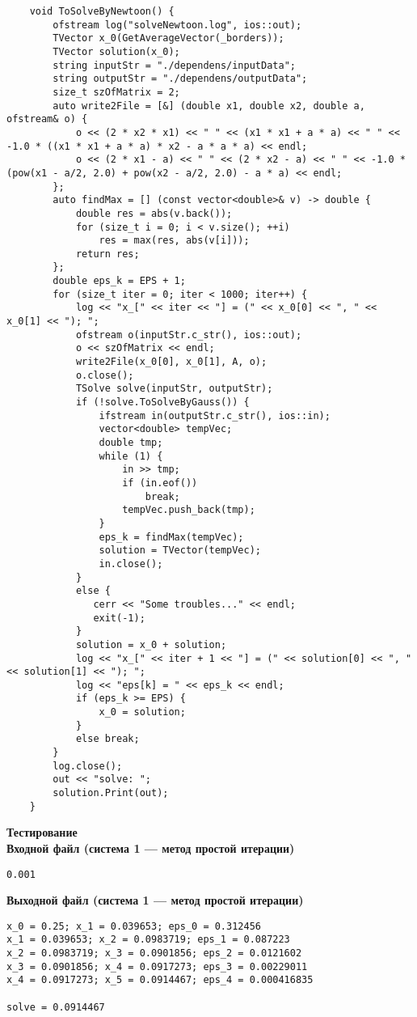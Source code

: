 \begin{lstlisting}
    void ToSolveByNewtoon() {
        ofstream log("solveNewtoon.log", ios::out);
        TVector x_0(GetAverageVector(_borders)); 
		TVector solution(x_0);
		string inputStr = "./dependens/inputData";
		string outputStr = "./dependens/outputData";
		size_t szOfMatrix = 2;
		auto write2File = [&] (double x1, double x2, double a, ofstream& o) {
			o << (2 * x2 * x1) << " " << (x1 * x1 + a * a) << " " << -1.0 * ((x1 * x1 + a * a) * x2 - a * a * a) << endl;
			o << (2 * x1 - a) << " " << (2 * x2 - a) << " " << -1.0 * (pow(x1 - a/2, 2.0) + pow(x2 - a/2, 2.0) - a * a) << endl;
		};
		auto findMax = [] (const vector<double>& v) -> double {
			double res = abs(v.back());
			for (size_t i = 0; i < v.size(); ++i)
				res = max(res, abs(v[i]));
			return res;
		};
		double eps_k = EPS + 1;
	    for (size_t iter = 0; iter < 1000; iter++) {
		    log << "x_[" << iter << "] = (" << x_0[0] << ", " << x_0[1] << "); ";
			ofstream o(inputStr.c_str(), ios::out);
		    o << szOfMatrix << endl;
			write2File(x_0[0], x_0[1], A, o);
		    o.close();
			TSolve solve(inputStr, outputStr);
			if (!solve.ToSolveByGauss()) {
				ifstream in(outputStr.c_str(), ios::in);
	            vector<double> tempVec;
				double tmp;
				while (1) {
				    in >> tmp;
				    if (in.eof())
				        break;
	                tempVec.push_back(tmp);
				}
				eps_k = findMax(tempVec);
				solution = TVector(tempVec);
				in.close();
		    }
	 	    else {
	           cerr << "Some troubles..." << endl;
		       exit(-1);
	 	    }
		    solution = x_0 + solution;
		    log << "x_[" << iter + 1 << "] = (" << solution[0] << ", " << solution[1] << "); ";
		    log << "eps[k] = " << eps_k << endl;
	        if (eps_k >= EPS) {
				x_0 = solution;
	        }
	        else break;
	    }
        log.close();
        out << "solve: ";
		solution.Print(out);
    }
\end{lstlisting}
\vspace{0.5cm}

\textbf{Тестирование}\\

\textbf{Входной файл (система 1 --- метод простой итерации)}
\begin{verbatim}
0.001
\end{verbatim}

\textbf{Выходной файл (система 1 --- метод простой итерации)}
\begin{verbatim}
x_0 = 0.25; x_1 = 0.039653; eps_0 = 0.312456
x_1 = 0.039653; x_2 = 0.0983719; eps_1 = 0.087223
x_2 = 0.0983719; x_3 = 0.0901856; eps_2 = 0.0121602
x_3 = 0.0901856; x_4 = 0.0917273; eps_3 = 0.00229011
x_4 = 0.0917273; x_5 = 0.0914467; eps_4 = 0.000416835

solve = 0.0914467
\end{verbatim}

